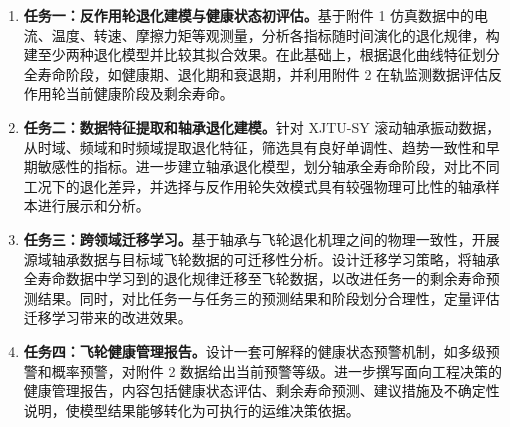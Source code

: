 \begin{enumerate}
    \item \textbf{任务一：反作用轮退化建模与健康状态初评估。}基于附件 1 仿真数据中的电流、温度、转速、摩擦力矩等观测量，分析各指标随时间演化的退化规律，构建至少两种退化模型并比较其拟合效果。在此基础上，根据退化曲线特征划分全寿命阶段，如健康期、退化期和衰退期，并利用附件 2 在轨监测数据评估反作用轮当前健康阶段及剩余寿命。

    \item \textbf{任务二：数据特征提取和轴承退化建模。}针对 XJTU-SY 滚动轴承振动数据，从时域、频域和时频域提取退化特征，筛选具有良好单调性、趋势一致性和早期敏感性的指标。进一步建立轴承退化模型，划分轴承全寿命阶段，对比不同工况下的退化差异，并选择与反作用轮失效模式具有较强物理可比性的轴承样本进行展示和分析。

    \item \textbf{任务三：跨领域迁移学习。}基于轴承与飞轮退化机理之间的物理一致性，开展源域轴承数据与目标域飞轮数据的可迁移性分析。设计迁移学习策略，将轴承全寿命数据中学习到的退化规律迁移至飞轮数据，以改进任务一的剩余寿命预测结果。同时，对比任务一与任务三的预测结果和阶段划分合理性，定量评估迁移学习带来的改进效果。

    \item \textbf{任务四：飞轮健康管理报告。}设计一套可解释的健康状态预警机制，如多级预警和概率预警，对附件 2 数据给出当前预警等级。进一步撰写面向工程决策的健康管理报告，内容包括健康状态评估、剩余寿命预测、建议措施及不确定性说明，使模型结果能够转化为可执行的运维决策依据。
\end{enumerate}
